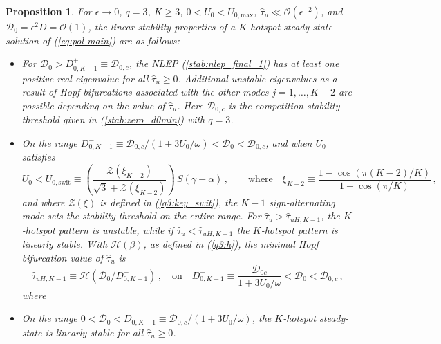 \documentclass{article}%
\newtheorem{prop}[theorem]{Proposition}
\begin{document}
\begin{prop}\label{q3:main_Kspots} For $\epsilon\to 0$, 
$q=3$, $K\geq 3$, $0<U_0<U_{0,\textrm{max}}$, $\hat{\tau}_u\ll
  {\mathcal O}(\epsilon^{-2})$, and ${\mathcal D}_0=\epsilon^2 D =
  {\mathcal O}(1)$, the linear stability properties of a $K$-hotspot
  steady-state solution of (\ref{eq:pol-main}) are as follows:
\begin{itemize}
  \item For ${\mathcal D}_0>D^{+}_{0,K-1} \equiv {\mathcal D}_{0,c}$, the
    NLEP (\ref{stab:nlep_final_1}) has at least one positive real eigenvalue for
    all $\hat{\tau}_u\geq 0$. Additional unstable eigenvalues as a result
    of Hopf bifurcations associated with the other modes $j=1,\ldots,K-2$ 
    are possible  depending on the value of $\hat{\tau}_u$. Here 
    ${\mathcal D}_{0,c}$ is the competition stability threshold given in
    (\ref{stab:zero_d0min}) with $q=3$.
 \item On the range $D^{-}_{0,K-1} \equiv 
  {{\mathcal D}_{0,c}/\left(1+{3U_0/\omega}\right)} < {\mathcal D}_0
    <{\mathcal D}_{0,c}$, and when $U_0$ satisfies
\begin{equation}\label{q3:u0mon}
     U_0 < U_{0,\textrm{swit}} \equiv \left( \frac{ {\mathcal Z}(\xi_{K-2})}
  { \sqrt{3} + {\mathcal Z}(\xi_{K-2})} \right) \, S(\gamma-\alpha)
  \,, \qquad \mbox{where} \quad \xi_{K-2} \equiv 
  \frac{1- \cos\left({\pi (K-2)/K}\right)}{1 + \cos\left({\pi /K}\right)} \,, 
\end{equation}
and where ${\mathcal Z}(\xi)$ is defined in (\ref{q3:key_swit}), the
$K-1$ sign-alternating mode sets the stability threshold on the entire
range.  For $\hat{\tau}_u>\hat{\tau}_{uH,K-1}$, the $K$-hotspot
pattern is unstable, while if $\hat{\tau}_u<\hat{\tau}_{uH,K-1}$ the
$K$-hotspot pattern is linearly stable. With ${\mathcal H}(\beta)$, as
defined in (\ref{q3:h}), the minimal Hopf bifurcation value of
$\hat{\tau}_u$ is 
\begin{equation}\label{q3:Kosc}
 \hat{\tau}_{uH,K-1}\equiv {\mathcal H}\left({{\mathcal
     D}_0/D^{-}_{0,K-1}}\right) \,, \quad \mbox{on} \quad
 D^{-}_{0,K-1}\equiv \frac{{\mathcal D}_{0c}}{1+{3U_0/\omega}}<{\mathcal
   D}_0 <{\mathcal D}_{0,c} \,,
\end{equation}
where 
\item On the range $0<{\mathcal D}_0 < D^{-}_{0,K-1} \equiv {{\mathcal
    D}_{0,c}/\left(1+{3U_0/\omega}\right)}$, the $K$-hotspot
  steady-state is linearly stable for all $\hat{\tau}_u\geq 0$.
\end{itemize}
\end{prop}
\end{document}
